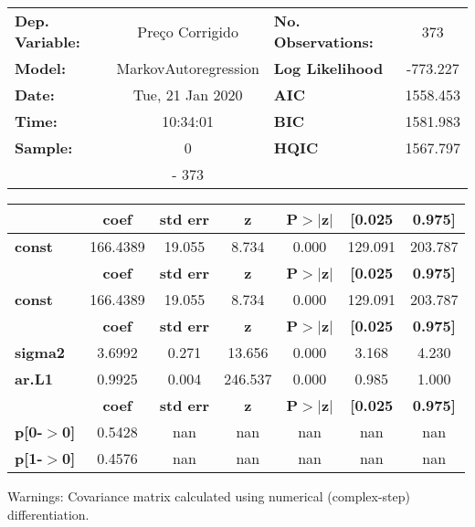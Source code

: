 \begin{center}
\begin{tabular}{lclc}
\toprule
\textbf{Dep. Variable:} &   Preço Corrigido    & \textbf{  No. Observations:  } &    373      \\
\textbf{Model:}         & MarkovAutoregression & \textbf{  Log Likelihood     } &  -773.227   \\
\textbf{Date:}          &   Tue, 21 Jan 2020   & \textbf{  AIC                } &  1558.453   \\
\textbf{Time:}          &       10:34:01       & \textbf{  BIC                } &  1581.983   \\
\textbf{Sample:}        &          0           & \textbf{  HQIC               } &  1567.797   \\
\textbf{}               &         - 373        & \textbf{                     } &             \\
\bottomrule
\end{tabular}
\begin{tabular}{lcccccc}
               & \textbf{coef} & \textbf{std err} & \textbf{z} & \textbf{P$>$$|$z$|$} & \textbf{[0.025} & \textbf{0.975]}  \\
\midrule
\textbf{const} &     166.4389  &       19.055     &     8.734  &         0.000        &      129.091    &      203.787     \\
               & \textbf{coef} & \textbf{std err} & \textbf{z} & \textbf{P$>$$|$z$|$} & \textbf{[0.025} & \textbf{0.975]}  \\
\midrule
\textbf{const} &     166.4389  &       19.055     &     8.734  &         0.000        &      129.091    &      203.787     \\
                & \textbf{coef} & \textbf{std err} & \textbf{z} & \textbf{P$>$$|$z$|$} & \textbf{[0.025} & \textbf{0.975]}  \\
\midrule
\textbf{sigma2} &       3.6992  &        0.271     &    13.656  &         0.000        &        3.168    &        4.230     \\
\textbf{ar.L1}  &       0.9925  &        0.004     &   246.537  &         0.000        &        0.985    &        1.000     \\
                   & \textbf{coef} & \textbf{std err} & \textbf{z} & \textbf{P$>$$|$z$|$} & \textbf{[0.025} & \textbf{0.975]}  \\
\midrule
\textbf{p[0-$>$0]} &       0.5428  &          nan     &       nan  &           nan        &          nan    &          nan     \\
\textbf{p[1-$>$0]} &       0.4576  &          nan     &       nan  &           nan        &          nan    &          nan     \\
\bottomrule
\end{tabular}
\end{center}

Warnings: \newline
 [1] Covariance matrix calculated using numerical (complex-step) differentiation.